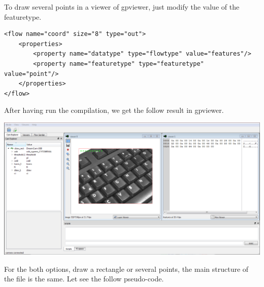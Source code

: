 \documentclass[12pt,a4paper]{article}
\begin{document}
To draw several points in a viewer of gpviewer, just modify the value of the featuretype.\\

\lstset{language=XML}
\begin{lstlisting}
<flow name="coord" size="8" type="out">
    <properties>
    	<property name="datatype" type="flowtype" value="features"/>
        <property name="featuretype" type="featuretype" value="point"/>
    </properties>
</flow>
\end{lstlisting}

\vspace{0.5cm}

After having run the compilation, we get the follow result in gpviewer.\\
 
\begin{center}
\includegraphics[width=\textwidth]{points.png}
\end{center}

\vspace{0.5cm}

For the both options, draw a rectangle or several points, the main structure of the file is the same. Let see the follow pseudo-code.\\
\end{document}
